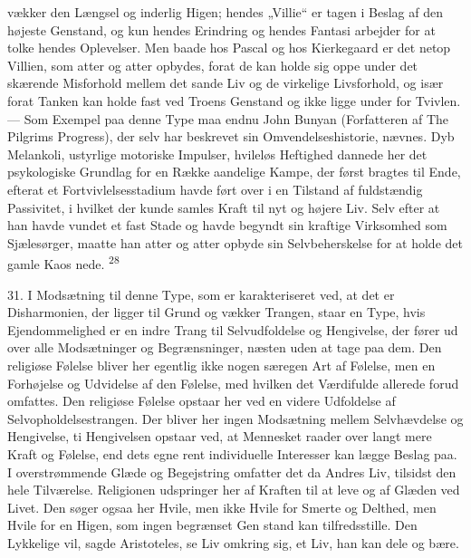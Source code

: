 \documentclass[12pt,a4paper,openany]{book}
\newcommand{\opage}[1]{\marginnote{\footnotesize\textit{[#1]}}}
\begin{document}
vækker den Længsel og inderlig Higen; hendes „Villie“ er tagen i Beslag
af den højeste Genstand, og kun hendes Erindring og hendes Fantasi
arbejder for at tolke hendes Oplevelser. Men baade hos Pascal og hos
Kierkegaard er det netop Villien, som atter og atter opbydes, forat de
kan holde sig oppe under det skærende Misforhold mellem det sande Liv og
de virkelige Livsforhold, og især forat Tanken kan holde fast ved Troens
Genstand og ikke ligge under for Tvivlen. --- Som Exempel paa denne Type
maa endnu John Bunyan (Forfatteren af The Pilgrims Progress), der selv
har beskrevet sin Omvendelseshistorie, nævnes. Dyb Melankoli, ustyrlige
motoriske Impulser, hvileløs Heftighed dannede her det psykologiske
Grundlag for en Række aandelige Kampe, der først bragtes til Ende,
efterat et Fortvivlelsesstadium havde ført over i en Tilstand af
fuldstændig Passivitet, i hvilket der kunde samles Kraft til nyt og
højere Liv. Selv efter at han havde vundet et fast Stade og havde
begyndt sin kraftige Virksomhed som Sjælesørger, maatte han atter og
atter opbyde sin Selvbeherskelse for at holde det gamle Kaos nede.
\textsuperscript{28}

31. I Modsætning til denne Type, som er karakteriseret ved, at det er
Disharmonien, der ligger til Grund og vækker Trangen, staar en Type,
hvis Ejendommelighed er en indre Trang til Selvudfoldelse og Hengivelse,
der fører ud over alle Modsætninger og Begrænsninger, næsten uden at
tage paa dem. Den religiøse Følelse bliver her egentlig ikke nogen
særegen Art af Følelse, men en Forhøjelse og Udvidelse af den Følelse,
med hvilken det Værdifulde allerede forud omfattes. Den religiøse
Følelse opstaar her ved en videre Udfoldelse af Selvopholdelsestrangen.
Der bliver her ingen Modsætning mellem Selvhævdelse og Hengivelse, ti
Hengivelsen opstaar ved, at Mennesket raader over langt mere Kraft og
Følelse, end dets egne rent individuelle Interesser kan lægge Beslag
paa. I overstrømmende Glæde og Begejstring omfatter det da Andres Liv,
tilsidst den hele Tilværelse. Religionen udspringer her af Kraften til
at leve og af Glæden ved Livet. Den søger ogsaa her Hvile, men ikke
Hvile for Smerte og Delthed, men Hvile for en Higen, som ingen begrænset
Gen%
\opage{75}stand kan tilfredsstille. Den Lykkelige vil, sagde
Aristoteles, se Liv omkring sig, et Liv, han kan dele og bære.
\end{document}
